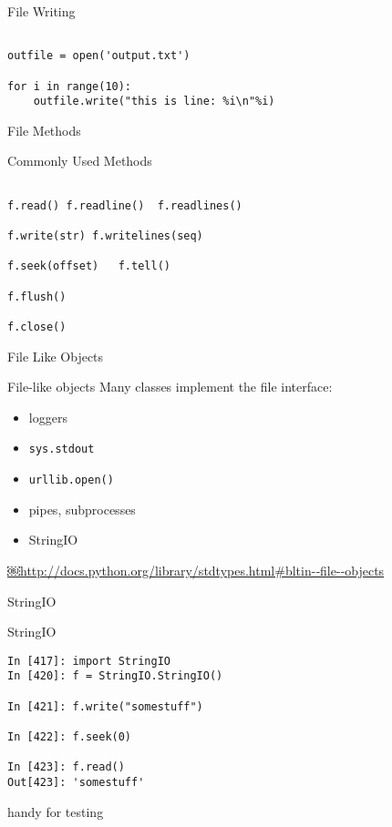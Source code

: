 \documentclass{beamer}
\begin{document}
\begin{frame}[fragile]{File Writing}

\begin{verbatim}

outfile = open('output.txt')

for i in range(10):
    outfile.write("this is line: %i\n"%i)

\end{verbatim}

\end{frame}

\begin{frame}[fragile]{File Methods}

{\Large Commonly Used Methods}
\begin{verbatim}

f.read() f.readline()  f.readlines() 

f.write(str) f.writelines(seq)
 
f.seek(offset)   f.tell()

f.flush()           
           
f.close() 
\end{verbatim}

\end{frame}

\begin{frame}[fragile]{File Like Objects}

{\Large File-like objects }
\vfill
{\large Many classes implement the file interface:}
\vfill
\begin{itemize}
  \item loggers
  \item \verb|sys.stdout|
  \item \verb|urllib.open()|
  \item pipes, subprocesses
  \item StringIO
\end{itemize}

\url{￼http://docs.python.org/library/stdtypes.html#bltin-­‐file-­‐objects}
\end{frame}

\begin{frame}[fragile]{StringIO}

{\Large StringIO }
\vfill
\begin{verbatim}
In [417]: import StringIO
In [420]: f = StringIO.StringIO()

In [421]: f.write("somestuff")

In [422]: f.seek(0)

In [423]: f.read()
Out[423]: 'somestuff'
\end{verbatim}

{\Large handy for testing}
\end{frame}
\end{document}
